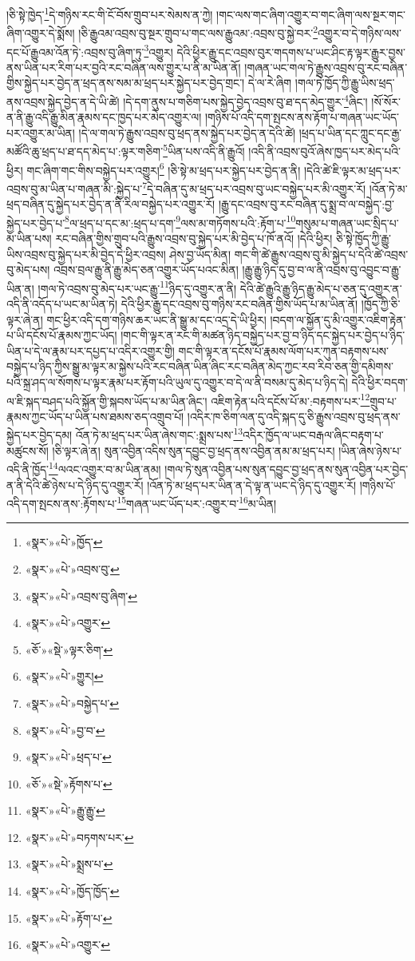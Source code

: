 །ཅི་སྟེ་ཁྱེད་\footnote{«སྣར་»«པེ་»ཁྱོད་}དེ་གཉིས་རང་གི་ངོ་བོས་གྲུབ་པར་སེམས་ན་ཀྱེ། །གང་ལས་གང་ཞིག་འགྱུར་བ་གང་ཞིག་ལས་སྔར་གང་ཞིག་འགྱུར་དེ་སྨོས། །ཅི་རྒྱུའམ་འབྲས་བུ་སྔར་གྲུབ་པ་གང་ལས་རྒྱུའམ་:འབྲས་བུ་སྐྱེ་བར་\footnote{«སྣར་»«པེ་»འབྲས་བུ་}འགྱུར་བ་དེ་གཉིས་ལས་དང་པོ་རྒྱུའམ་འོན་ཏེ་:འབྲས་བུ་ཞིག་ཏུ་\footnote{«སྣར་»«པེ་»འབྲས་བུ་ཞིག་}འགྱུར། དེའི་ཕྱིར་རྒྱུ་དང་འབྲས་བུར་གདགས་པ་ཡང་ཤིང་རྟ་ལྟར་རྒྱུར་བྱས་ནས་ཡིན་པར་རིག་པར་བྱའི་རང་བཞིན་ལས་གྱུར་པ་ནི་མ་ཡིན་ནོ། །གཞན་ཡང་གལ་ཏེ་རྒྱུས་འབྲས་བུ་རང་བཞིན་གྱིས་སྐྱེད་པར་བྱེད་ན་ཕྲད་ནས་སམ་མ་ཕྲད་པར་སྐྱེད་པར་བྱེད་གྲང་། དེ་ལ་རེ་ཞིག །གལ་ཏེ་ཁྱོད་ཀྱི་རྒྱུ་ཡིས་ཕྲད་ནས་འབྲས་སྐྱེད་བྱེད་ན་དེ་ཡི་ཚེ། །དེ་དག་ནུས་པ་གཅིག་པས་སྐྱེད་བྱེད་འབྲས་བུ་ཐ་དད་མེད་གྱུར་\footnote{«སྣར་»«པེ་»འགྱུར་}ཞིང་། །སོ་སོར་ན་ནི་རྒྱུ་འདི་རྒྱུ་མིན་རྣམས་དང་ཁྱད་པར་མེད་འགྱུར་ལ། །གཉིས་པོ་འདི་དག་སྤངས་ནས་རྟོག་པ་གཞན་ཡང་ཡོད་པར་འགྱུར་མ་ཡིན། །དེ་ལ་གལ་ཏེ་རྒྱུས་འབྲས་བུ་ཕྲད་ནས་སྐྱེད་པར་བྱེད་ན་དེའི་ཚེ། །ཕྲད་པ་ཡིན་དང་ཀླུང་དང་རྒྱ་མཚོའི་ཆུ་ཕྲད་པ་ཐ་དད་མེད་པ་:ལྟར་གཅིག་\footnote{«ཅོ་»«སྡེ་»ལྟར་ཅིག་}ཡིན་པས་འདི་ནི་རྒྱུའོ། །འདི་ནི་འབྲས་བུའོ་ཞེས་ཁྱད་པར་མེད་པའི་ཕྱིར། གང་ཞིག་གང་གིས་བསྐྱེད་པར་འགྱུར།\footnote{«སྣར་»«པེ་»གྱུར།} །ཅི་སྟེ་མ་ཕྲད་པར་སྐྱེད་པར་བྱེད་ན་ནི། །དེའི་ཚེ་ཇི་ལྟར་མ་ཕྲད་པར་འབྲས་བུ་མ་ཡིན་པ་གཞན་མི་:སྐྱེད་པ་\footnote{«སྣར་»«པེ་»བསྐྱེད་པ་}དེ་བཞིན་དུ་མ་ཕྲད་པར་འབྲས་བུ་ཡང་བསྐྱེད་པར་མི་འགྱུར་རོ། །འོན་ཏེ་མ་ཕྲད་བཞིན་དུ་སྐྱེད་པར་བྱེད་ན་ནི་རིལ་བསྐྱེད་པར་འགྱུར་རོ། །རྒྱུ་དང་འབྲས་བུ་རང་བཞིན་དུ་སྨྲ་བ་ལ་བསྐྱེད་:བྱ་སྐྱེད་པར་བྱེད་པ་\footnote{«སྣར་»«པེ་»བྱ་བ་}ལ་ཕྲད་པ་དང་མ་:ཕྲད་པ་དག་\footnote{«སྣར་»«པེ་»ཕྲད་པ་}ལས་མ་གཏོགས་པའི་:རྟོག་པ་\footnote{«ཅོ་»«སྡེ་»རྟོགས་པ་}གསུམ་པ་གཞན་ཡང་སྲིད་པ་མ་ཡིན་པས། རང་བཞིན་གྱིས་གྲུབ་པའི་རྒྱུས་འབྲས་བུ་སྐྱེད་པར་མི་བྱེད་པ་ཁོ་ནའོ། །དེའི་ཕྱིར། ཅི་སྟེ་ཁྱོད་ཀྱི་རྒྱུ་ཡིས་འབྲས་བུ་སྐྱེད་པར་མི་བྱེད་དེ་ཕྱིར་འབྲས། ཤེས་བྱ་ཡོད་མིན། གང་གི་ཚེ་རྒྱུས་འབྲས་བུ་མི་སྐྱེད་པ་དེའི་ཚེ་འབྲས་བུ་མེད་པས། འབྲས་བྲལ་རྒྱུ་ནི་རྒྱུ་མེད་ཅན་འགྱུར་ཡོད་པའང་མིན། །རྒྱུ་རྒྱུ་ཉིད་དུ་བྱ་བ་ལ་ནི་འབྲས་བུ་འབྱུང་བ་རྒྱུ་ཡིན་ན། །གལ་ཏེ་འབྲས་བུ་མེད་པར་ཡང་རྒྱུ་\footnote{«སྣར་»«པེ་»རྒྱུ་རྒྱུ་}ཉིད་དུ་འགྱུར་ན་ནི། དེའི་ཚེ་རྒྱུའི་རྒྱུ་ཉིད་རྒྱུ་མེད་པ་ཅན་དུ་འགྱུར་ན་འདི་ནི་འདོད་པ་ཡང་མ་ཡིན་ཏེ། དེའི་ཕྱིར་རྒྱུ་དང་འབྲས་བུ་གཉིས་རང་བཞིན་གྱིས་ཡོད་པ་མ་ཡིན་ནོ། །ཁྱོད་ཀྱི་ཅི་ལྟར་ཞེ་ན། གང་ཕྱིར་འདི་དག་གཉིས་ཆར་ཡང་ནི་སྒྱུ་མ་དང་འདྲ་དེ་ཡི་ཕྱིར། །བདག་ལ་སྐྱོན་དུ་མི་འགྱུར་འཇིག་རྟེན་པ་ཡི་དངོས་པོ་རྣམས་ཀྱང་ཡོད། །གང་གི་ལྟར་ན་རང་གི་མཚན་ཉིད་བསྐྱེད་པར་བྱ་བ་ཉིད་དང་སྐྱེད་པར་བྱེད་པ་ཉིད་ཡིན་པ་དེ་ལ་རྣམ་པར་དཔྱད་པ་འདིར་འགྱུར་གྱི། གང་གི་ལྟར་ན་དངོས་པོ་རྣམས་ལོག་པར་ཀུན་བརྟགས་པས་བསྐྱེད་པ་ཉིད་ཀྱིས་སྒྱུ་མ་ལྟར་མ་སྐྱེས་པའི་རང་བཞིན་ཡིན་ཞིང་རང་བཞིན་མེད་ཀྱང་རབ་རིབ་ཅན་གྱི་དམིགས་པའི་སྐྲ་ཤད་ལ་སོགས་པ་ལྟར་རྣམ་པར་རྟོག་པའི་ཡུལ་དུ་འགྱུར་བ་དེ་ལ་ནི་བསམ་དུ་མེད་པ་ཉིད་དེ། དེའི་ཕྱིར་བདག་ལ་ཇི་སྐད་བཤད་པའི་སྐྱོན་གྱི་སྐབས་ཡོད་པ་མ་ཡིན་ཞིང་། འཇིག་རྟེན་པའི་དངོས་པོ་མ་:བརྟགས་པར་\footnote{«སྣར་»«པེ་»བཏགས་པར་}གྲུབ་པ་རྣམས་ཀྱང་ཡོད་པ་ཡིན་པས་ཐམས་ཅད་འགྲུབ་པོ། །འདིར་ཁ་ཅིག་ལན་དུ་འདི་སྐད་དུ་ཅི་རྒྱུས་འབྲས་བུ་ཕྲད་ནས་སྐྱེད་པར་བྱེད་དམ། འོན་ཏེ་མ་ཕྲད་པར་ཡིན་ཞེས་གང་:སྨྲས་པས་\footnote{«སྣར་»«པེ་»སྨྲས་པ་}འདིར་ཁྱོད་ལ་ཡང་བརྒལ་ཞིང་བརྟག་པ་མཚུངས་སོ། །ཅི་ལྟར་ཞེ་ན། སུན་འབྱིན་འདིས་སུན་དབྱུང་བྱ་ཕྲད་ནས་འབྱིན་ནམ་མ་ཕྲད་པར། །ཡིན་ཞེས་ཉེས་པ་འདི་ནི་ཁྱོད་\footnote{«སྣར་»«པེ་»ཁྱོད་ཁྱོད་}ལའང་འགྱུར་བ་མ་ཡིན་ནམ། །གལ་ཏེ་སུན་འབྱིན་པས་སུན་དབྱུང་བྱ་ཕྲད་ནས་སུན་འབྱིན་པར་བྱེད་ན་ནི་དེའི་ཚེ་ཉེས་པ་དེ་ཉིད་དུ་འགྱུར་རོ། །འོན་ཏེ་མ་ཕྲད་པར་ཡིན་ན་དེ་ལྟ་ན་ཡང་དེ་ཉིད་དུ་འགྱུར་རོ། །གཉིས་པོ་འདི་དག་སྤངས་ནས་:རྟོགས་པ་\footnote{«སྣར་»«པེ་»རྟོག་པ་}གཞན་ཡང་ཡོད་པར་:འགྱུར་བ་\footnote{«སྣར་»«པེ་»འགྱུར་}མ་ཡིན། 